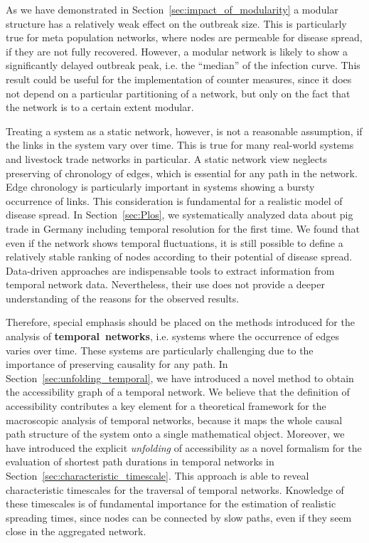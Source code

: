 As we have demonstrated in Section~\ref{sec:impact_of_modularity} a modular structure has a relatively weak effect on the outbreak size.
This is particularly true for meta population networks, where nodes are permeable for disease spread, if they are not fully recovered.
However, a modular network is likely to show a significantly delayed outbreak peak, i.e. the ``median'' of the infection curve.
This result could be useful for the implementation of counter measures, since it does not depend on a particular partitioning of a network, but only on the fact that the network is to a certain extent modular.

Treating a system as a static network, however, is not a reasonable assumption, if the links in the system vary over time.
This is true for many real-world systems and livestock trade networks in particular.
A static network view neglects preserving of chronology of edges, which is essential for any path in the network.
Edge chronology is particularly important in systems showing a bursty occurrence of links.
This consideration is fundamental for a realistic model of disease spread.
In Section~\ref{sec:Plos}, we systematically analyzed data about pig trade in Germany including temporal resolution for the first time.
We found that even if the network shows temporal fluctuations, it is still possible to define a relatively stable ranking of nodes according to their potential of disease spread.
Data-driven approaches are indispensable tools to extract information from temporal network data.
Nevertheless, their use does not provide a deeper understanding of the reasons for the observed results.

Therefore, special emphasis should be placed on the methods introduced for the analysis of \textbf{temporal~networks}, i.e. systems where the occurrence of edges varies over time.
These systems are particularly challenging due to the importance of preserving causality for any path.
In Section~\ref{sec:unfolding_temporal}, we have introduced a novel method to obtain the accessibility graph of a temporal network.
We believe that the definition of accessibility contributes a key element for a theoretical framework for the macroscopic analysis of temporal networks, because it maps the whole causal path structure of the system onto a single mathematical object.
Moreover, we have introduced the explicit \emph{unfolding} of accessibility as a novel formalism for the evaluation of shortest path durations in temporal networks in Section~\ref{sec:characteristic_timescale}.
This approach is able to reveal characteristic timescales for the traversal of temporal networks.
Knowledge of these timescales is of fundamental importance for the estimation of realistic spreading times, since nodes can be connected by slow paths, even if they seem close in the aggregated network.

